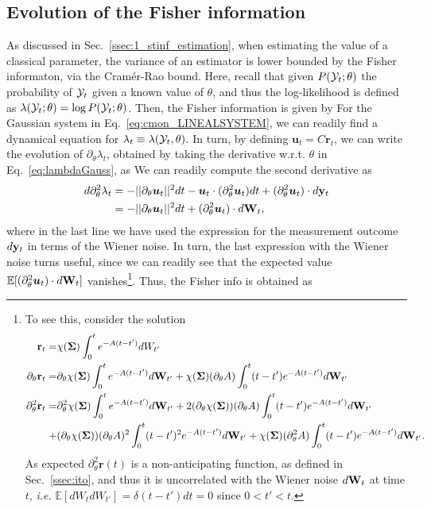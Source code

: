 \subsection{Evolution of the Fisher information}
As discussed in Sec.~\ref{ssec:1_stinf_estimation}, when estimating the value of a classical parameter, the variance of an estimator is lower bounded by the Fisher informaton, via the Cramér-Rao bound. Here, recall that given $P(\mathcal{Y}_t;\theta)$ the probability of $\mathcal{Y}_t$ given a known value of $\theta$, and thus the log-likelihood is defined as $\lambda(\mathcal{Y}_t; \theta) = \log{P(\mathcal{Y}_t;\theta)}$. Then, the Fisher information is given by
For the Gaussian system in Eq.~\ref{eq:cmon_LINEALSYSTEM}, we can readily find a dynamical equation for $\lambda_{t} \equiv \lambda(\mathcal{Y}_t, \theta)$. In turn, by defining $\bm{u}_{t} = C \mathbf{r}_{t}$, we can write the evolution of $\partial_\theta \lambda_{t}$, obtained by taking the derivative w.r.t. $\theta$ in Eq.~\ref{eq:lambdaGauss}, as
We can readily compute the second derivative as
\begin{align}
d \partial^2_\theta \lambda_{t} &=  - || \partial_\theta \bm{u}_{t}||^2dt - \bm{u}_{t}\cdot (\partial^2_\theta \bm{u}_{t}) dt  + (\partial^2_\theta \bm{u}_{t})\cdot d\mathbf{y}_t\\
&= - || \partial_\theta \bm{u}_{t}||^2dt + (\partial^2_\theta\bm{u}_{t})\cdot d\mathbf{W}_t,
\end{align}
where in the last line we have used the expression for the measurement outcome $d\mathbf{y}_t$ in terms of the Wiener noise. In turn, the last expression with the Wiener noise turns useful, since we can readily see that the expected value $\mathbb{E}[(\partial^2_\theta\bm{u}_{t})\cdot d\mathbf{W}_t]$ vanishes\footnote{
To see this, consider the solution
\begin{align*}
\mathbf{r}_{t} =& \chi(\bm{\Sigma})\int_0^t e^{-A(t-t')}dW_{t'} \\
\partial_\theta \mathbf{r}_{t} =&  \partial_\theta \chi(\bm{\Sigma}) \int_0^t e^{-A(t-t')}d\mathbf{W}_{t'} + \chi(\bm{\Sigma}) (\partial_\theta A) \int_0^t (t-t')e^{-A(t-t')}d\mathbf{W}_{t'} \\
\partial^2_\theta \mathbf{r}_{t} =&  \partial^2_\theta \chi(\bm{\Sigma}) \int_0^t e^{-A(t-t')}d\mathbf{W}_{t'} + 2(\partial_\theta \chi(\bm{\Sigma})) (\partial_\theta A) \int_0^t (t-t') e^{-A(t-t')}d\mathbf{W}_{t'} \\ +& (\partial_\theta \chi(\bm{\Sigma})) (\partial_\theta A)^2 \int_0^t (t-t')^2 e^{-A(t-t')}d\mathbf{W}_{t'} + \chi(\bm{\Sigma}) (\partial^2_\theta A) \int_0^t (t-t') e^{-A(t-t')}d\mathbf{W}_{t'}.
\end{align*}
As expected $\partial^2_\theta \mathbf{r}(t)$ is a non-anticipating function, as defined in Sec.~\ref{ssec:ito}, and thus it is uncorrelated with the Wiener noise $d\mathbf{W}_t$ at time $t$, \textit{i.e.} $\mathbb{E}[dW_t dW_{t'}] = \delta(t-t')dt = 0$ since $0<t'<t$.
}. Thus, the Fisher info is obtained as
